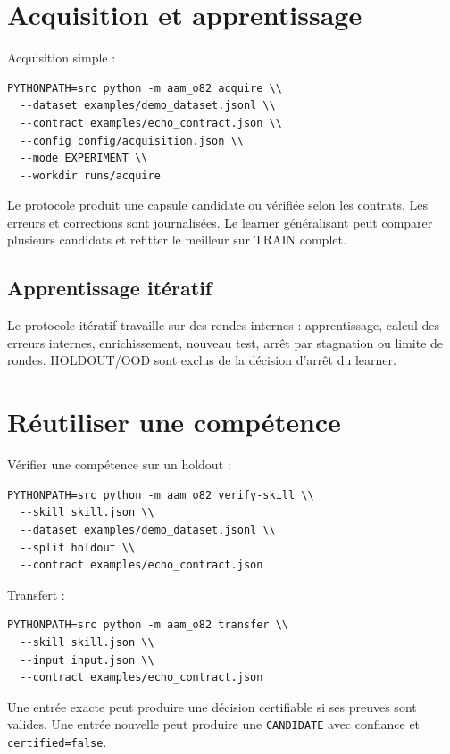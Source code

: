 \documentclass[11pt,a4paper]{report}
\begin{document}
\chapter{Acquisition et apprentissage}
Acquisition simple :
\begin{verbatim}
PYTHONPATH=src python -m aam_o82 acquire \\
  --dataset examples/demo_dataset.jsonl \\
  --contract examples/echo_contract.json \\
  --config config/acquisition.json \\
  --mode EXPERIMENT \\
  --workdir runs/acquire
\end{verbatim}
Le protocole produit une capsule candidate ou vérifiée selon les contrats. Les erreurs et corrections sont journalisées. Le learner généralisant peut comparer plusieurs candidats et refitter le meilleur sur TRAIN complet.

\section{Apprentissage itératif}
Le protocole itératif travaille sur des rondes internes : apprentissage, calcul des erreurs internes, enrichissement, nouveau test, arrêt par stagnation ou limite de rondes. HOLDOUT/OOD sont exclus de la décision d'arrêt du learner.

\chapter{Réutiliser une compétence}
Vérifier une compétence sur un holdout :
\begin{verbatim}
PYTHONPATH=src python -m aam_o82 verify-skill \\
  --skill skill.json \\
  --dataset examples/demo_dataset.jsonl \\
  --split holdout \\
  --contract examples/echo_contract.json
\end{verbatim}
Transfert :
\begin{verbatim}
PYTHONPATH=src python -m aam_o82 transfer \\
  --skill skill.json \\
  --input input.json \\
  --contract examples/echo_contract.json
\end{verbatim}
Une entrée exacte peut produire une décision certifiable si ses preuves sont valides. Une entrée nouvelle peut produire une \texttt{CANDIDATE} avec confiance et \texttt{certified=false}.
\end{document}
